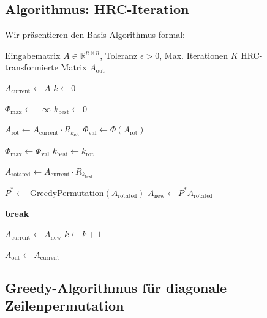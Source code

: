 \documentclass[a4paper,12pt]{article}
\theoremstyle{definition}
\begin{document}
\subsection{Algorithmus: HRC-Iteration}

Wir präsentieren den Basis-Algorithmus formal:

\begin{algorithm}[H]
\caption{Hybrid Rotation-Diagonal Congruence (HRC) Iteration}
\begin{algorithmic}[1]
\Require Eingabematrix $A \in \mathbb{R}^{n \times n}$, Toleranz $\epsilon > 0$, Max. Iterationen $K$
\Ensure HRC-transformierte Matrix $A_{\text{out}}$

\State $A_{\text{current}} \gets A$
\State $k \gets 0$

	\State {}
	\State $\Phi_{\max} \gets -\infty$
	\State $k_{\text{best}} \gets 0$
	
		\State $A_{\text{rot}} \gets A_{\text{current}} \cdot R_{k_{\text{rot}}}$
		\State $\Phi_{\text{val}} \gets \Phi(A_{\text{rot}})$ 
		
			\State $\Phi_{\max} \gets \Phi_{\text{val}}$
			\State $k_{\text{best}} \gets k_{\text{rot}}$
		\EndIf
	\EndFor
	
	\State $A_{\text{rotated}} \gets A_{\text{current}} \cdot R_{k_{\text{best}}}$
	
	\State {}
	\State $P^* \gets$ GreedyPermutation$(A_{\text{rotated}})$ 
	\State $A_{\text{new}} \gets P^* A_{\text{rotated}}$
	
	\State {}
		\State \textbf{break} 
	\EndIf
	
	\State $A_{\text{current}} \gets A_{\text{new}}$
	\State $k \gets k + 1$
\EndWhile

\State \Return $A_{\text{out}} \gets A_{\text{current}}$
\end{algorithmic}
\end{algorithm}

\subsection{Greedy-Algorithmus für diagonale Zeilenpermutation}
\end{document}
